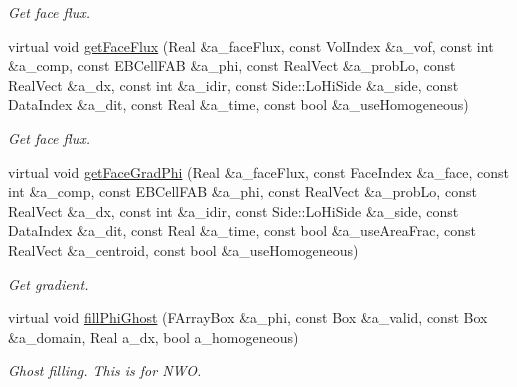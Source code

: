 \begin{DoxyCompactItemize}
\begin{DoxyCompactList}\small\item\em Get face flux. \end{DoxyCompactList}\item 
virtual void \hyperlink{classconductivitydomainbc__wrapper_af17424837bc49ac5827f5c51c41b1950}{get\+Face\+Flux} (Real \&a\+\_\+face\+Flux, const Vol\+Index \&a\+\_\+vof, const int \&a\+\_\+comp, const E\+B\+Cell\+F\+AB \&a\+\_\+phi, const Real\+Vect \&a\+\_\+prob\+Lo, const Real\+Vect \&a\+\_\+dx, const int \&a\+\_\+idir, const Side\+::\+Lo\+Hi\+Side \&a\+\_\+side, const Data\+Index \&a\+\_\+dit, const Real \&a\+\_\+time, const bool \&a\+\_\+use\+Homogeneous)
\begin{DoxyCompactList}\small\item\em Get face flux. \end{DoxyCompactList}\item 
virtual void \hyperlink{classconductivitydomainbc__wrapper_a575b8a15927b796f39b90345702777ad}{get\+Face\+Grad\+Phi} (Real \&a\+\_\+face\+Flux, const Face\+Index \&a\+\_\+face, const int \&a\+\_\+comp, const E\+B\+Cell\+F\+AB \&a\+\_\+phi, const Real\+Vect \&a\+\_\+prob\+Lo, const Real\+Vect \&a\+\_\+dx, const int \&a\+\_\+idir, const Side\+::\+Lo\+Hi\+Side \&a\+\_\+side, const Data\+Index \&a\+\_\+dit, const Real \&a\+\_\+time, const bool \&a\+\_\+use\+Area\+Frac, const Real\+Vect \&a\+\_\+centroid, const bool \&a\+\_\+use\+Homogeneous)
\begin{DoxyCompactList}\small\item\em Get gradient. \end{DoxyCompactList}\item 
virtual void \hyperlink{classconductivitydomainbc__wrapper_aa274564bc6bf846f41802e9f207df3d9}{fill\+Phi\+Ghost} (F\+Array\+Box \&a\+\_\+phi, const Box \&a\+\_\+valid, const Box \&a\+\_\+domain, Real a\+\_\+dx, bool a\+\_\+homogeneous)
\begin{DoxyCompactList}\small\item\em Ghost filling. This is for N\+WO. \end{DoxyCompactList}\end{DoxyCompactItemize}
